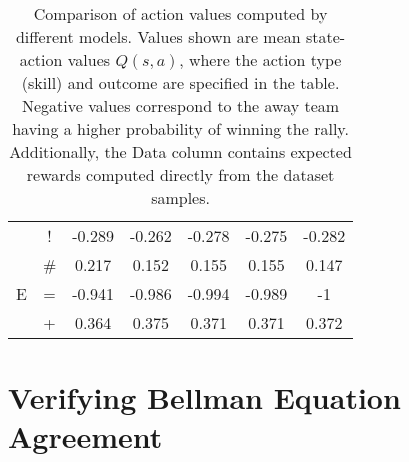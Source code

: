 \documentclass{sfuthesis}
\begin{document}
\begin{table}[]
\begin{tabular}{ccccccc}
		& \multicolumn{1}{c|}{!}                & -0.289             & -0.262                & -0.278               & \multicolumn{1}{c|}{-0.275}              & -0.282        \\
		& \multicolumn{1}{c|}{\#}               & 0.217              & 0.152                 & 0.155                & \multicolumn{1}{c|}{0.155}               & 0.147         \\ \hline
		E              & \multicolumn{1}{c|}{=}                & -0.941             & -0.986                & -0.994               & \multicolumn{1}{c|}{-0.989}              & -1            \\
		& \multicolumn{1}{c|}{+}                & 0.364              & 0.375                 & 0.371                & \multicolumn{1}{c|}{0.371}               & 0.372        
	\end{tabular}
	\caption{Comparison of action values computed by different models. Values shown are mean state-action values $Q(s,a)$, where the action type (skill) and outcome are specified in the table. Negative values correspond to the away team having a higher probability of winning the rally. Additionally, the Data column contains expected rewards computed directly from the dataset samples.}
	\label{tab:qvalues}
\end{table}

\section{Verifying Bellman Equation Agreement}
\end{document}
